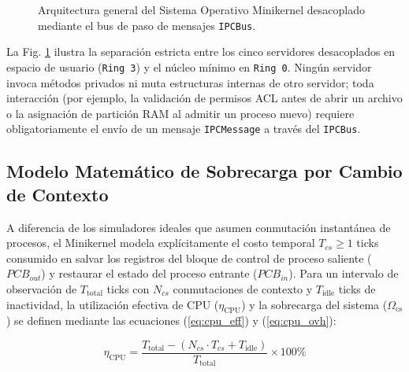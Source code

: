 \documentclass[10pt,twocolumn,letterpaper]{article}
\begin{document}
\begin{figure}[!htb]
\caption{Arquitectura general del Sistema Operativo Minikernel desacoplado mediante el bus de paso de mensajes \texttt{IPCBus}.}
\label{fig:arquitectura_general}
\end{figure}

La Fig. \ref{fig:arquitectura_general} ilustra la separaci\'on estricta entre los cinco servidores desacoplados en espacio de usuario (\texttt{Ring 3}) y el n\'ucleo m\'inimo en \texttt{Ring 0}. Ning\'un servidor invoca m\'etodos privados ni muta estructuras internas de otro servidor; toda interacci\'on (por ejemplo, la validaci\'on de permisos ACL antes de abrir un archivo o la asignaci\'on de partici\'on RAM al admitir un proceso nuevo) requiere obligatoriamente el env\'io de un mensaje \texttt{IPCMessage} a trav\'es del \texttt{IPCBus}.

\subsection{Modelo Matem\'atico de Sobrecarga por Cambio de Contexto}
A diferencia de los simuladores ideales que asumen conmutaci\'on instant\'anea de procesos, el Minikernel modela expl\'icitamente el costo temporal $T_{cs} \ge 1$ ticks consumido en salvar los registros del bloque de control de proceso saliente ($PCB_{out}$) y restaurar el estado del proceso entrante ($PCB_{in}$). Para un intervalo de observaci\'on de $T_{\text{total}}$ ticks con $N_{cs}$ conmutaciones de contexto y $T_{\text{idle}}$ ticks de inactividad, la utilizaci\'on efectiva de CPU ($\eta_{\text{CPU}}$) y la sobrecarga del sistema ($\Omega_{\text{cs}}$) se definen mediante las ecuaciones (\ref{eq:cpu_eff}) y (\ref{eq:cpu_ovh}):

\begin{equation}
  \eta_{\text{CPU}} = \frac{T_{\text{total}} - \left(N_{cs} \cdot T_{cs} + T_{\text{idle}}\right)}{T_{\text{total}}} \times 100\%
  \label{eq:cpu_eff}
\end{equation}
\end{document}
